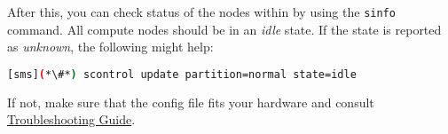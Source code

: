 

After this, you can check status of the nodes within \SLURM{} by using the \texttt{sinfo} 
command. All compute nodes should be in an {\em idle} state. If the state
is reported as {\em unknown}, the following might help:

\begin{lstlisting}[language=bash]
[sms](*\#*) scontrol update partition=normal state=idle
\end{lstlisting}

If not, make sure that the \SLURM{} config file fits your hardware and consult 
\href{https://slurm.schedmd.com/troubleshoot.html}{\color{blue}\SLURM{} Troubleshooting Guide}.
